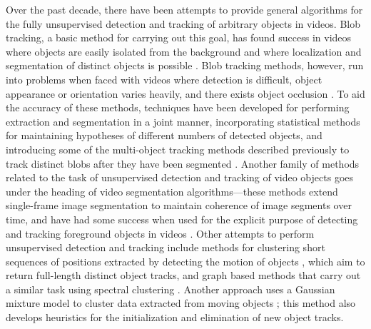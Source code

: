 \documentclass[twocolumn, final]{svjour3}
\begin{document}
Over the past decade, there have been attempts to provide general algorithms for the fully unsupervised detection and tracking of arbitrary objects in videos. Blob tracking, a basic method for carrying out this goal, has found success in videos where objects are easily isolated from the background and where localization and segmentation of distinct objects is possible \cite{francois2004real, isard_2001}. Blob tracking methods, however, run into problems when faced with videos where detection is difficult, object appearance or orientation varies heavily, and there exists object occlusion \cite{song2005model}. To aid the accuracy of these methods, techniques have been developed for performing extraction and segmentation in a joint manner, incorporating statistical methods for maintaining hypotheses of different numbers of detected objects, and introducing some of the multi-object tracking methods described previously to track distinct blobs after they have been segmented \cite{collins2003mean, isard_2001}. Another family of methods related to the task of unsupervised detection and tracking of video objects goes under the heading of video segmentation algorithms---these methods extend single-frame image segmentation to maintain coherence of image segments over time, and have had some success when used for the explicit purpose of detecting and tracking foreground objects in videos \cite{brox2003unsupervised, sista2000unsupervised, wang1998unsupervised}. Other attempts to perform unsupervised detection and tracking include methods for clustering short sequences of positions extracted by detecting the motion of objects \cite{brostow2006unsupervised, brox2010object}, which aim to return full-length distinct object tracks, and graph based methods that carry out a similar task using spectral clustering \cite{fragkiadaki2011detection}. Another approach uses a Gaussian mixture model to cluster data extracted from moving objects \cite{pece_2002}; this method also develops heuristics for the initialization and elimination of new object tracks. 
\end{document}
